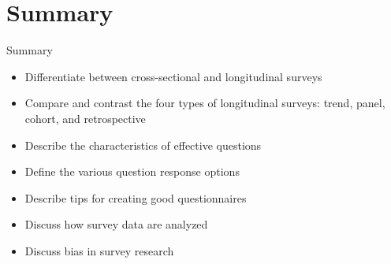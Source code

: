 \section{Summary}

\begin{center}
	\begin{tkawybox}{Summary}
		\begin{itemize}
			\setlength{\itemsep}{0pt}
			\setlength{\parskip}{0pt}
			\setlength{\parsep}{0pt}
			
			\item Differentiate between cross-sectional and longitudinal surveys
			\item Compare and contrast the four types of longitudinal surveys: trend, panel, cohort, and retrospective
			\item Describe the characteristics of effective questions
			\item Define the various question response options
			\item Describe tips for creating good questionnaires
			\item Discuss how survey data are analyzed
			\item Discuss bias in survey research

		\end{itemize}
	\end{tkawybox}
\end{center}
